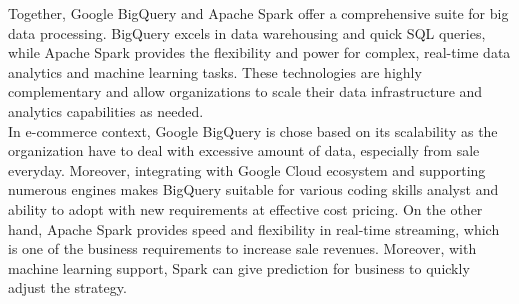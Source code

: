Together, Google BigQuery and Apache Spark offer a comprehensive suite for big data processing.
BigQuery excels in data warehousing and quick SQL queries, while Apache Spark provides the
flexibility and power for complex, real-time data analytics and machine learning tasks. These
technologies are highly complementary and allow organizations to scale their data infrastructure and
analytics capabilities as needed.\\
In e-commerce context, Google BigQuery is chose based on its scalability as the organization have to deal with excessive amount of data, especially from sale everyday. Moreover, integrating with Google Cloud ecosystem and supporting numerous engines makes BigQuery suitable for various coding skills analyst and ability to adopt with new requirements at effective cost pricing. On the other hand, Apache Spark provides speed and flexibility in real-time streaming, which is one of the business requirements to increase sale revenues. Moreover, with machine learning support, Spark can give prediction for business to quickly adjust the strategy.
